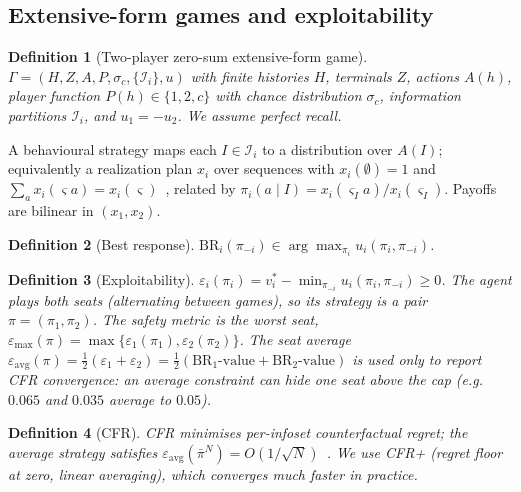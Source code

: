 \documentclass[11pt]{article}
\newtheorem{definition}{Definition}
\newcommand{\eps}{\varepsilon}
\newcommand{\emax}{\eps_{\max}}
\newcommand{\BR}{\mathrm{BR}}
\newcommand{\new}[1]{\textcolor{blue!55!black}{#1}}
\begin{document}
\subsection{Extensive-form games and exploitability}
\begin{definition}[Two-player zero-sum extensive-form game]
$\Gamma=(H,Z,A,P,\sigma_c,\{\mathcal I_i\},u)$ with finite histories $H$, terminals $Z$, actions $A(h)$, player function $P(h)\in\{1,2,c\}$ with chance distribution $\sigma_c$, information partitions $\mathcal I_i$, and $u_1=-u_2$. We assume perfect recall.
\end{definition}
A behavioural strategy maps each $I\in\mathcal I_i$ to a distribution over $A(I)$; equivalently a realization plan $x_i$ over sequences with $x_i(\emptyset)=1$ and $\sum_a x_i(\varsigma a)=x_i(\varsigma)$~\cite{koller1996}, related by $\pi_i(a\mid I)=x_i(\varsigma_I a)/x_i(\varsigma_I)$. Payoffs are bilinear in $(x_1,x_2)$.
\begin{definition}[Best response] $\BR_i(\pi_{-i})\in\arg\max_{\pi_i}u_i(\pi_i,\pi_{-i})$.\end{definition}
\begin{definition}[Exploitability]
$\eps_i(\pi_i)=v_i^*-\min_{\pi_{-i}}u_i(\pi_i,\pi_{-i})\ge 0$. The agent plays both seats (alternating between games), so its strategy is a pair $\pi=(\pi_1,\pi_2)$. \new{The safety metric is the worst seat, $\emax(\pi)=\max\{\eps_1(\pi_1),\eps_2(\pi_2)\}$. The seat average $\eps_{\mathrm{avg}}(\pi)=\tfrac12(\eps_1+\eps_2)=\tfrac12(\BR_1\text{-value}+\BR_2\text{-value})$ is used only to report CFR convergence: an average constraint can hide one seat above the cap (e.g.\ $0.065$ and $0.035$ average to $0.05$).}
\end{definition}
\begin{definition}[CFR] CFR minimises per-infoset counterfactual regret; the average strategy satisfies $\eps_{\mathrm{avg}}(\bar\pi^N)=O(1/\sqrt N)$~\cite{zinkevich2007}. We use CFR+ (regret floor at zero, linear averaging), which converges much faster in practice.\end{definition}
\end{document}
